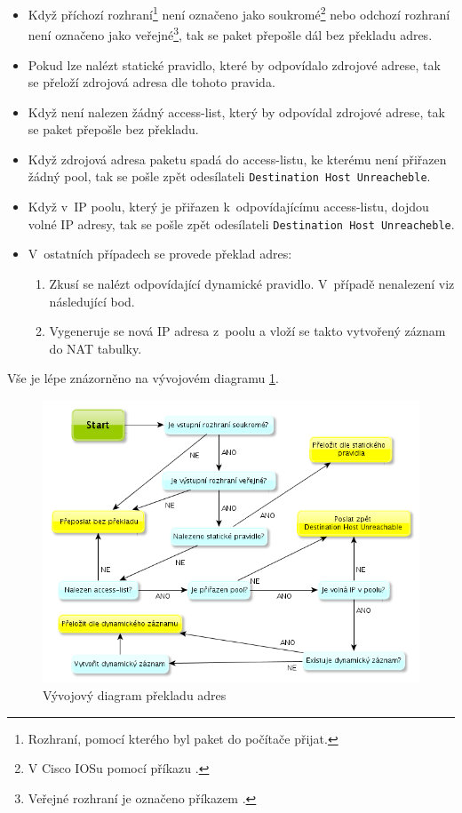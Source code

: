 \begin{itemize}
\item Když příchozí rozhraní\footnote{Rozhraní, pomocí kterého byl paket do počítače přijat.} není označeno jako soukromé\footnote{V Cisco IOSu pomocí příkazu .} nebo odchozí rozhraní není označeno jako veřejné\footnote{Veřejné rozhraní je označeno příkazem .}, tak se paket přepošle dál bez překladu adres.

\item Pokud lze nalézt statické pravidlo, které by odpovídalo zdrojové adrese, tak se přeloží zdrojová adresa dle tohoto pravida.

\item Když není nalezen žádný access-list, který by odpovídal zdrojové adrese, tak se paket přepošle bez překladu.

\item Když zdrojová adresa paketu spadá do access-listu, ke kterému není přiřazen žádný pool, tak se pošle zpět odesílateli \verb|Destination Host Unreacheble|.

\item Když v~IP poolu, který je přiřazen k~odpovídajícímu access-listu, dojdou volné IP adresy, tak se pošle zpět odesílateli \verb|Destination Host Unreacheble|.

\item V~ostatních případech se provede překlad adres:
    \begin{enumerate}
    \item Zkusí se nalézt odpovídající dynamické pravidlo. V~případě nenalezení viz následující bod.
    \item Vygeneruje se nová IP adresa z~poolu a vloží se takto vytvořený záznam do NAT tabulky.
    \end{enumerate}
\end{itemize}

Vše je lépe znázorněno na vývojovém diagramu \ref{fig:nat_decision}.

\begin{figure}[b]
\begin{center}
\includegraphics[width=16cm]{figures/nat_decision}
\caption{Vývojový diagram překladu adres}
\label{fig:nat_decision}
\end{center}
\end{figure}

